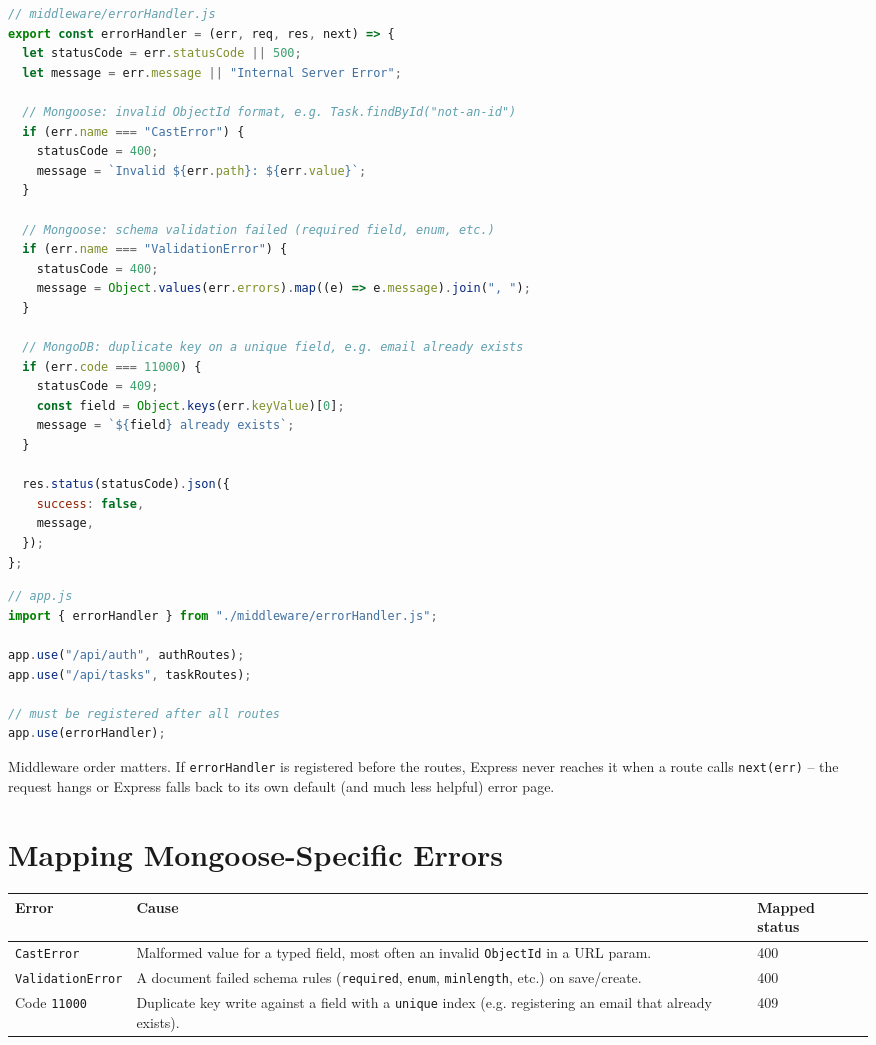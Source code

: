 \begin{lstlisting}[language=JavaScript]
// middleware/errorHandler.js
export const errorHandler = (err, req, res, next) => {
  let statusCode = err.statusCode || 500;
  let message = err.message || "Internal Server Error";

  // Mongoose: invalid ObjectId format, e.g. Task.findById("not-an-id")
  if (err.name === "CastError") {
    statusCode = 400;
    message = `Invalid ${err.path}: ${err.value}`;
  }

  // Mongoose: schema validation failed (required field, enum, etc.)
  if (err.name === "ValidationError") {
    statusCode = 400;
    message = Object.values(err.errors).map((e) => e.message).join(", ");
  }

  // MongoDB: duplicate key on a unique field, e.g. email already exists
  if (err.code === 11000) {
    statusCode = 409;
    const field = Object.keys(err.keyValue)[0];
    message = `${field} already exists`;
  }

  res.status(statusCode).json({
    success: false,
    message,
  });
};
\end{lstlisting}

\begin{lstlisting}[language=JavaScript]
// app.js
import { errorHandler } from "./middleware/errorHandler.js";

app.use("/api/auth", authRoutes);
app.use("/api/tasks", taskRoutes);

// must be registered after all routes
app.use(errorHandler);
\end{lstlisting}

\begin{warnbox}[WARNING]
Middleware order matters. If \texttt{errorHandler} is registered before the
routes, Express never reaches it when a route calls \texttt{next(err)} --
the request hangs or Express falls back to its own default (and much less
helpful) error page.
\end{warnbox}

\section{Mapping Mongoose-Specific Errors}

\begin{center}
\begin{tabularx}{\textwidth}{lXl}
\toprule
\textbf{Error} & \textbf{Cause} & \textbf{Mapped status} \\
\midrule
\texttt{CastError} & Malformed value for a typed field, most often an invalid \texttt{ObjectId} in a URL param. & 400 \\
\texttt{ValidationError} & A document failed schema rules (\texttt{required}, \texttt{enum}, \texttt{minlength}, etc.) on save/create. & 400 \\
Code \texttt{11000} & Duplicate key write against a field with a \texttt{unique} index (e.g. registering an email that already exists). & 409 \\
\bottomrule
\end{tabularx}
\end{center}

